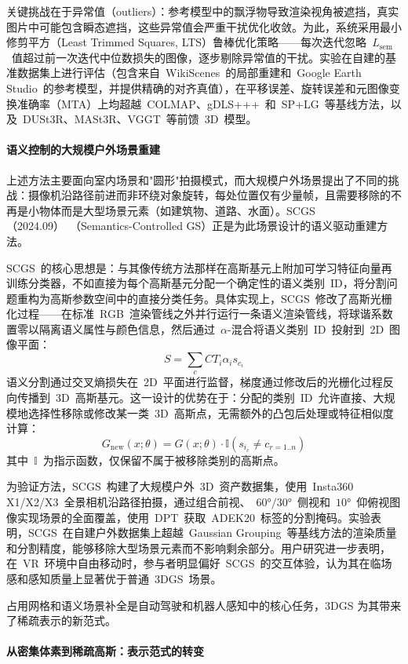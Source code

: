 关键挑战在于异常值（outliers）：参考模型中的飘浮物导致渲染视角被遮挡，真实图片中可能包含瞬态遮挡，这些异常值会严重干扰优化收敛。为此，系统采用最小修剪平方（Least Trimmed Squares, LTS）鲁棒优化策略——每次迭代忽略~$L_{\text{sem}}$~值超过前一次迭代中位数损失的图像，逐步剔除异常值的干扰。实验在自建的基准数据集上进行评估（包含来自~WikiScenes~的局部重建和~Google Earth Studio~的参考模型，并提供精确的对齐真值），在平移误差、旋转误差和元图像变换准确率（MTA）上均超越~COLMAP、gDLS+++~和~SP+LG~等基线方法，以及~DUSt3R、MASt3R、VGGT~等前馈~3D~模型。

\paragraph{语义控制的大规模户外场景重建}

上述方法主要面向室内场景和"圆形"拍摄模式，而大规模户外场景提出了不同的挑战：摄像机沿路径前进而非环绕对象旋转，每处位置仅有少量帧，且需要移除的不再是小物体而是大型场景元素（如建筑物、道路、水面）。SCGS（2024.09）~\cite{2409_15959}（Semantics-Controlled GS）正是为此场景设计的语义驱动重建方法。

SCGS~的核心思想是：与其像传统方法那样在高斯基元上附加可学习特征向量再训练分类器，不如直接为每个高斯基元分配一个确定性的语义类别~ID，将分割问题重构为高斯参数空间中的直接分类任务。具体实现上，SCGS~修改了高斯光栅化过程——在标准~RGB~渲染管线之外并行运行一条语义渲染管线，将球谐系数置零以隔离语义属性与颜色信息，然后通过~$\alpha$-混合将语义类别~ID~投射到~2D~图像平面：
$$S = \sum_{c} C T_i \alpha_i s_{c_i}$$
语义分割通过交叉熵损失在~2D~平面进行监督，梯度通过修改后的光栅化过程反向传播到~3D~高斯基元。这一设计的优势在于：分配的类别~ID~允许直接、大规模地选择性移除或修改某一类~3D~高斯点，无需额外的凸包后处理或特征相似度计算：
$$G_{\text{new}}(x; \theta) = G(x; \theta) \cdot \mathbb{I}(s_{i_c} \neq c_{r=1..n})$$
其中~$\mathbb{I}$~为指示函数，仅保留不属于被移除类别的高斯点。

为验证方法，SCGS~构建了大规模户外~3D~资产数据集，使用~Insta360 X1/X2/X3~全景相机沿路径拍摄，通过组合前视、~$60°/30°$~侧视和~$10°$~仰俯视图像实现场景的全面覆盖，使用~DPT~获取~ADEK20~标签的分割掩码。实验表明，SCGS~在自建户外数据集上超越~Gaussian Grouping~等基线方法的渲染质量和分割精度，能够移除大型场景元素而不影响剩余部分。用户研究进一步表明，在~VR~环境中自由移动时，参与者明显偏好~SCGS~的交互体验，认为其在临场感和感知质量上显著优于普通~3DGS~场景。

占用网格和语义场景补全是自动驾驶和机器人感知中的核心任务，3DGS 为其带来了稀疏表示的新范式。

\paragraph{从密集体素到稀疏高斯：表示范式的转变}


